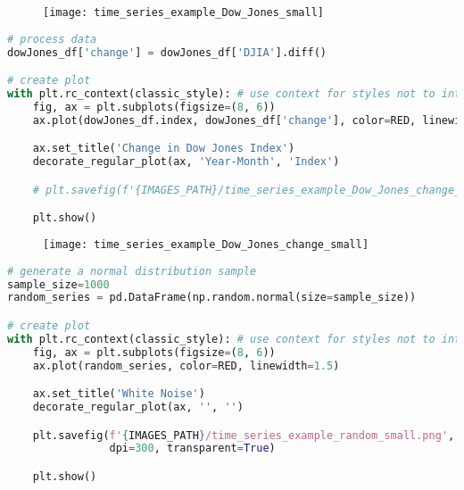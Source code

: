 \begin{figure}[h!]
  \centering
  \texttt{[image: time\_series\_example\_Dow\_Jones\_small]}
\end{figure}\newpage


\begin{center}
  \begin{lstlisting}[language=Python, 
  caption={Изменение в индексе Доу Джонса.}, 
  label={lst:time_series_example_Dow_Jones_change_small}]
# process data
dowJones_df['change'] = dowJones_df['DJIA'].diff()

# create plot
with plt.rc_context(classic_style): # use context for styles not to interfere
    fig, ax = plt.subplots(figsize=(8, 6))
    ax.plot(dowJones_df.index, dowJones_df['change'], color=RED, linewidth=1.5)

    ax.set_title('Change in Dow Jones Index')
    decorate_regular_plot(ax, 'Year-Month', 'Index')

    # plt.savefig(f'{IMAGES_PATH}/time_series_example_Dow_Jones_change_small.png', dpi=300, transparent=True)

    plt.show()
  \end{lstlisting}
\end{center}

\begin{figure}[h!]
  \centering
  \texttt{[image: time\_series\_example\_Dow\_Jones\_change\_small]}
\end{figure}\newpage


\begin{center}
  \begin{lstlisting}[language=Python, 
  caption={Белый шум.}, 
  label={lst:time_series_example_random_small}]
# generate a normal distribution sample
sample_size=1000
random_series = pd.DataFrame(np.random.normal(size=sample_size)) 

# create plot
with plt.rc_context(classic_style): # use context for styles not to interfere
    fig, ax = plt.subplots(figsize=(8, 6))
    ax.plot(random_series, color=RED, linewidth=1.5)

    ax.set_title('White Noise')
    decorate_regular_plot(ax, '', '')

    plt.savefig(f'{IMAGES_PATH}/time_series_example_random_small.png', 
                dpi=300, transparent=True)

    plt.show()
  \end{lstlisting}
\end{center}


